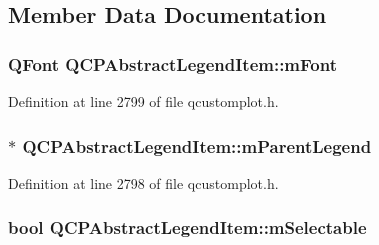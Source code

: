\subsection{Member Data Documentation}
\hypertarget{class_q_c_p_abstract_legend_item_ae916a78ac0d2a60e20a17ca2f24f9754}{
\subsubsection[{m\-Font}]{\setlength{\rightskip}{0pt plus 5cm}Q\-Font Q\-C\-P\-Abstract\-Legend\-Item\-::m\-Font\hspace{0.3cm}{\ttfamily [protected]}}}\label{class_q_c_p_abstract_legend_item_ae916a78ac0d2a60e20a17ca2f24f9754}


Definition at line 2799 of file qcustomplot.\-h.

\hypertarget{class_q_c_p_abstract_legend_item_aafcd9fc6fcb10f4a8d46037011afafe8}{
\subsubsection[{m\-Parent\-Legend}]{$\ast$ Q\-C\-P\-Abstract\-Legend\-Item\-::m\-Parent\-Legend\hspace{0.3cm}{\ttfamily [protected]}}}\label{class_q_c_p_abstract_legend_item_aafcd9fc6fcb10f4a8d46037011afafe8}


Definition at line 2798 of file qcustomplot.\-h.

\hypertarget{class_q_c_p_abstract_legend_item_aa84029f57b1b32f642fb7db63c3fc2c2}{
\subsubsection[{m\-Selectable}]{\setlength{\rightskip}{0pt plus 5cm}bool Q\-C\-P\-Abstract\-Legend\-Item\-::m\-Selectable\hspace{0.3cm}{\ttfamily [protected]}}}\label{class_q_c_p_abstract_legend_item_aa84029f57b1b32f642fb7db63c3fc2c2}


